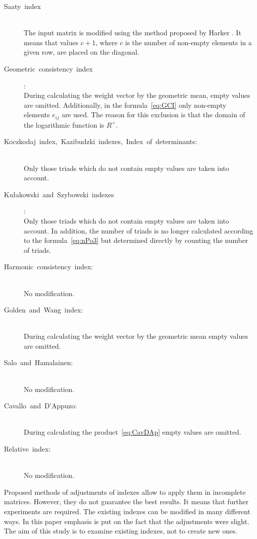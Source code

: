 \begin{description}

\item[Saaty index] \hfill \\ 
	The input matrix is modified using the method proposed by Harker \cite{HARKER1987}. It means that values $c+1$, where $c$ is the number of non-empty elements in a given row, are placed on the diagonal.

\item[Geometric consistency index]: \hfill \\
	During calculating the weight vector by the geometric mean, empty values are omitted. Additionally, in the formula~\ref{eq:GCI} only non-empty elements $e_{ij}$ are used. The reason for this exclusion is that the domain of the logarithmic function is $R^{+}$.

\item[Koczkodaj index, Kazibudzki indexes, Index of determinants:] \hfill \\ 
  Only those triads which do not contain empty values are taken into account.

\item[Kułakowski and Szybowski indexes]: \hfill \\ 
	Only those triads which do not contain empty values are taken into account. In addition, the number of triads is no longer calculated according to the formula~\ref{eq:nPo3} but determined directly by counting the number of triads.

\item[Harmonic consistency index:] \hfill \\ 
  No modification.

\item[Golden and Wang index:] \hfill \\ 
  During calculating the weight vector by the geometric mean empty values are omitted.

\item[Salo and Hamalainen:] \hfill \\ 
  No modification.

\item[Cavallo and D'Appuzo:] \hfill \\
	During calculating the product~\ref{eq:CavDAp} empty values are omitted.

\item[Relative index:] \hfill \\ 
  No modification.
\end{description}

Proposed methods of adjustments of indexes allow to apply them in incomplete matrices. However, they do not guarantee the best results. It means that further experiments are required. The existing indexes can be modified in many different ways. In this paper emphasis is put on the fact that the adjustments were slight. The aim of this study is to examine existing indexes, not to create new ones.